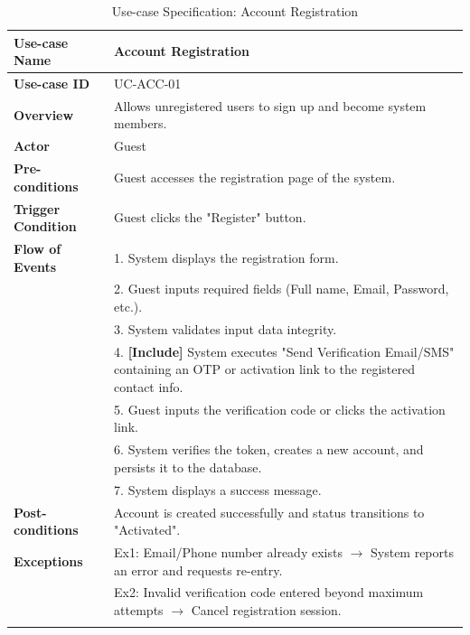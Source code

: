 \begin{longtable}{|p{3.5cm}|p{11.5cm}|}
    \hline
    \textbf{Use-case Name} & \textbf{Account Registration} \\
    \hline
    \textbf{Use-case ID} & UC-ACC-01 \\
    \hline
    \textbf{Overview} & Allows unregistered users to sign up and become system members. \\
    \hline
    \textbf{Actor} & Guest \\
    \hline
    \textbf{Pre-conditions} & Guest accesses the registration page of the system. \\
    \hline
    \textbf{Trigger Condition} & Guest clicks the "Register" button. \\
    \hline
    \textbf{Flow of Events} & 
    1. System displays the registration form.\\ 
 & 
    2. Guest inputs required fields (Full name, Email, Password, etc.).\\ 
 & 
    3. System validates input data integrity.\\ 
 & 
    4. \textbf{[Include]} System executes "Send Verification Email/SMS" containing an OTP or activation link to the registered contact info.\\ 
 & 
    5. Guest inputs the verification code or clicks the activation link.\\ 
 & 
    6. System verifies the token, creates a new account, and persists it to the database.\\ 
 & 
    7. System displays a success message. \\
    \hline
    \textbf{Post-conditions} & Account is created successfully and status transitions to "Activated". \\
    \hline
    \textbf{Exceptions} & 
    Ex1: Email/Phone number already exists $\rightarrow$ System reports an error and requests re-entry.\\ 
 & 
    Ex2: Invalid verification code entered beyond maximum attempts $\rightarrow$ Cancel registration session. \\
    \hline
    \caption{Use-case Specification: Account Registration} \\
\end{longtable}

